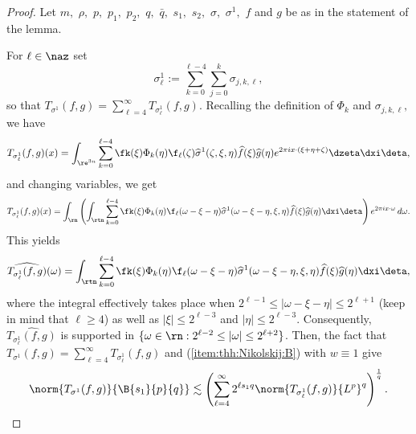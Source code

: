 \begin{proof}  Let $m,$ $\rho,$ $p,$ $p_1,$ $p_2,$ $q,$ $\bar{q},$ $s_1,$  $s_2,$ $\sigma,$ $\sigma^1,$ $f$ and $g$ be as in the statement of the lemma. 

For $\ell \in \naz$  set
$$
\sigma^1_\ell:=  \sum\limits_{k=0}^{\ell -4} \sum\limits_{j =0}^{k} \sigma_{j,k,\ell},
$$
so that $T_{\sigma^1}(f,g)= \sum\limits_{\ell=4}^\infty T_{\sigma^1_\ell}(f,g)$. Recalling the definition of $\Phi_k$ and $\sigma_{j,k,\ell},$ we have
\begin{align*}
T_{\sigma^1_\ell}(f,g)(x)= \int_{\re^{3n}} \sum\limits_{k=0}^{\ell -4}   \fk(\xi) \Phi_k(\eta)  \f_\ell(\zeta) \widehat{\sigma}^1(\zeta, \xi, \eta) \widehat{f}(\xi) \widehat{g}(\eta) e^{2\pi i x \cdot (\xi + \eta + \zeta)}  \dzeta \dxi \deta,
\end{align*}
and changing variables, we get
\begin{align*}
T_{\sigma^1_\ell}(f,g)(x)= \int_{\rn} \left( \int_{\rtn}  \sum\limits_{k=0}^{\ell -4}   \fk(\xi) \Phi_k(\eta)  \f_\ell(\omega- \xi - \eta) \widehat{\sigma}^1(\omega- \xi - \eta, \xi, \eta) \widehat{f}(\xi) \widehat{g}(\eta) \dxi \deta \right)  e^{2\pi i x \cdot \omega} \, d\omega.
\end{align*}
This yields
\begin{align*}
\widehat{T_{\sigma^1_\ell}(f,g)}(\omega)=  \int_{\rtn}  \sum\limits_{k=0}^{\ell -4}   \fk(\xi) \Phi_k(\eta)  \f_\ell(\omega- \xi - \eta) \widehat{\sigma}^1(\omega- \xi - \eta, \xi, \eta) \widehat{f}(\xi) \widehat{g}(\eta) \dxi \deta,
\end{align*}
where the integral effectively takes place when $ 2^{\ell-1}\le |\omega- \xi - \eta| \leq 2^{\ell +1}$ (keep in mind that $\ell\ge 4$)  as well as $|\xi| \leq 2^{\ell-3}$ and $|\eta| \leq 2^{\ell-3}.$  Consequently,
$\widehat{T_{\sigma^1_\ell}(f,g)}$ is supported in $\{\omega\in\rn: 2^{\ell-2}\le |\omega| \leq 2^{\ell +2}\}$. Then, the fact that  $T_{\sigma^1}(f,g)= \sum\limits_{\ell=4}^\infty T_{\sigma^1_\ell}(f,g)$  and (\ref{item:thh:Nikolskij:B}) with $w\equiv 1$ give
\begin{equation}\label{eq:T:sigma:1:fg}
\norm{T_{\sigma^1}(f,g)}{\B{s_1}{p}{q}} \lesssim  \left( \sum\limits_{\ell=4}^\infty 2^{\ell s_1q} \norm{T_{\sigma^1_\ell}(f,g)}{{L^p}}^q \right)^\frac{1}{q}.
\end{equation}


\end{proof}

